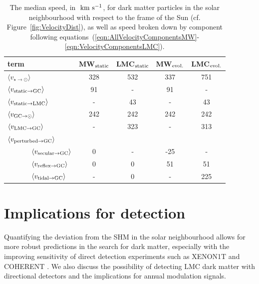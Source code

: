 \documentclass[fleqn,usenatbib]{mnras}
\newcommand{\kms}{{\rm ~km~s^{-1}}}	%
\begin{document}
\begin{table}
 \centering
 \begin{tabular}{llcccc}
    \hline
term  && MW$_{\rm static}$   &LMC$_{\rm static}$ & MW$_{\rm evol.}$  &LMC$_{\rm evol.}$\\
    \hline
\multicolumn{2}{l}{$\langle v_{\star\to\odot}\rangle$} & 328 & 532 & 337 & 751 \\
    \hline
\multicolumn{2}{l}{$\langle v_{{\rm static}\to{\rm GC}}\rangle$} & 91  & -  & 91    & - \\
\multicolumn{2}{l}{$\langle v_{{\rm static}\to{\rm LMC}}\rangle$} & -  & 43  & -    & 43 \\
\multicolumn{2}{l}{$\langle v_{{\rm GC}\to\odot}\rangle$} & 242 & 242 & 242   & 242 \\
\multicolumn{2}{l}{$\langle v_{{\rm LMC}\to{\rm GC}}\rangle$} & -  & 323  & -   & 313 \\

\multicolumn{2}{l}{$\langle v_{{\rm perturbed}\to{\rm GC}}\rangle$} & & & & \\
&$\langle v_{{\rm secular}\to{\rm GC}}\rangle$       & 0   & -   & -25   & - \\
&$\langle v_{{\rm reflex}\to{\rm GC}}\rangle$        & 0   & 0   & 51    & 51 \\
&$\langle v_{{\rm tidal}\to{\rm GC}}\rangle$         & -   & 0   & -     & 225 \\
    \hline
    \end{tabular}
 \caption{\label{tab:PeakVelocities} The median speed, in $\kms$, for dark matter particles in the solar neighbourhood with respect to the frame of the Sun (cf. Figure~\ref{fig:VelocityDist}), as well as speed broken down by component following equations~(\ref{eqn:AllVelocityComponentsMW}-\ref{eqn:VelocityComponentsLMC}). }
\end{table}

\vspace{-0.2cm}
\section{Implications for detection} \label{Section:Discussion}

Quantifying the deviation from the SHM in the solar neighbourhood allows for more robust predictions in the search for dark matter, especially with the improving sensitivity of direct detection experiments such as XENON1T \citep{Aprile_2017} and COHERENT \citep{Akimov_2020}. We also discuss the possibility of detecting LMC dark matter with directional detectors and the implications for annual modulation signals.
\end{document}

